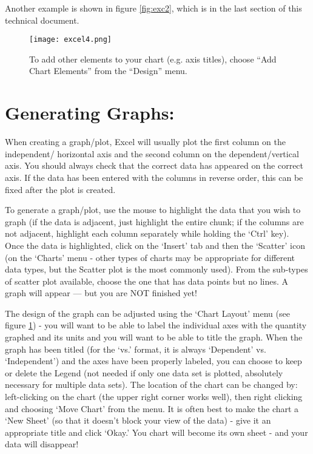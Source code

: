 Another example is shown in figure \ref{fig:exc2}, which is in the last section of this technical document.

\begin{figure}[ht]
\texttt{[image: excel4.png]}
\centering
\caption{To add other elements to your chart (e.g. axis titles), choose ``Add Chart Elements'' from the ``Design'' menu.}
\label{fig:exc4}
\end{figure}

\section*{Generating Graphs:}
When creating a graph/plot, Excel will usually plot the first column on the independent/ horizontal axis and the second column on the dependent/vertical axis. 
You should always check that the correct data has appeared on the correct axis. 
If the data has been entered with the columns in reverse order, this can be fixed after the plot is created.
\par
To generate a graph/plot, use the mouse to highlight the data that you wish to graph (if the data is adjacent, just highlight the entire chunk; if the columns are not adjacent, highlight each column separately while holding the `Ctrl' key). 
Once the data is highlighted, click on the `Insert' tab and then the `Scatter' icon (on the `Charts' menu - other types of charts may be appropriate for different data types, but the Scatter plot is the most commonly used). 
From the sub-types of scatter plot available, choose the one that has data points but no lines. 
A graph will appear — but you are NOT finished yet!
\par
The design of the graph can be adjusted using the `Chart Layout' menu (see figure \ref{fig:exc4}) - you will want to be able to label the individual axes with the quantity graphed and its units and you will want to be able to title the graph. 
When the graph has been titled (for the `vs.' format, it is always `Dependent' vs. `Independent') and the axes have been properly labeled, you can choose to keep or delete the Legend (not needed if only one data set is plotted, absolutely necessary for multiple data sets). 
The location of the chart can be changed by: left-clicking on the chart (the upper right corner works well), then right clicking and choosing `Move Chart' from the menu. 
It is often best to make the chart a `New Sheet' (so that it doesn't block your view of the data) - give it an appropriate title and click `Okay.' 
You chart will become its own sheet - and your data will disappear! 
